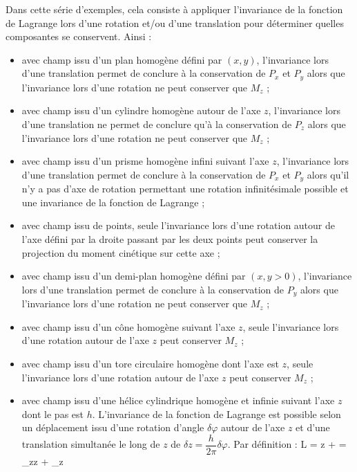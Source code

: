 Dans cette s\'erie d'exemples, cela consiste \`a appliquer l'invariance de la fonction de Lagrange lors d'une rotation et/ou d'une translation pour d\'eterminer quelles composantes se conservent. Ainsi :
\begin{itemize}
	\item[a)] avec champ issu d'un plan homog\`ene d\'efini par $(x,y)$, l'invariance lors d'une translation permet de conclure \`a la conservation de $P_{x}$ et $P_{y}$ alors que l'invariance lors d'une rotation ne peut conserver que $M_{z}$ ;
	\item[b)] avec champ issu d'un cylindre homog\`ene autour de l'axe $z$, l'invariance lors d'une translation ne permet de conclure qu'\`a la conservation de $P_{z}$ alors que l'invariance lors d'une rotation ne peut conserver que $M_{z}$ ;
	\item[c)] avec champ issu d'un prisme homog\`ene infini suivant l'axe $z$, l'invariance lors d'une translation permet de conclure \`a la conservation de $P_{x}$ et $P_{y}$ alors qu'il n'y a pas d'axe de rotation permettant une rotation infinit\'esimale possible et une invariance de la fonction de Lagrange ;
	\item[d)] avec champ issu de points, seule l'invariance lors d'une rotation autour de l'axe d\'efini par la droite passant par les deux points peut conserver la projection du moment cin\'etique sur cette axe ;
	\item[e)] avec champ issu d'un demi-plan homog\`ene d\'efini par $(x,y > 0)$, l'invariance lors d'une translation permet de conclure \`a la conservation de $P_{y}$ alors que l'invariance lors d'une rotation ne peut conserver que $M_{z}$ ;
	\item[f)] avec champ issu d'un c\^one homog\`ene suivant l'axe $z$, seule l'invariance lors d'une rotation autour de l'axe $z$ peut conserver $M_{z}$ ;
	\item[g)] avec champ issu d'un tore circulaire homog\`ene dont l'axe est $z$, seule l'invariance lors d'une rotation autour de l'axe $z$ peut conserver $M_{z}$ ;
	\item[h)] avec champ issu d'une h\'elice cylindrique homog\`ene et infinie suivant l'axe $z$ dont le pas est $h$. L'invariance de la fonction de Lagrange est possible selon un d\'eplacement issu d'une rotation d'angle $\delta\varphi$ autour de l'axe $z$ et d'une translation simultan\'ee le long de $z$ de $\delta z = \dfrac{h}{2\pi}\delta\varphi$. Par d\'efinition :
		\be
			\delta L = \delta z + \delta\varphi = _{z}\delta z + _{z}\delta\varphi

\end{itemize}
